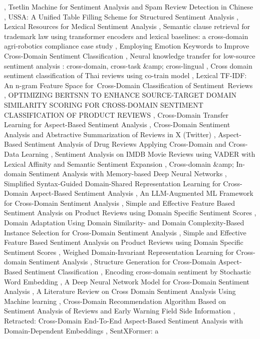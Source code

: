 \documentclass{article}
\begin{document}
\cite{neha2025retrievalaugmented537affb3}, Tsetlin Machine for Sentiment Analysis and Spam Review Detection in Chinese \cite{zhang2023tsetline116ff6e}, USSA: A Unified Table Filling Scheme for Structured Sentiment Analysis \cite{zhai2023ussa558da815}, Lexical Resources for Medical Sentiment Analysis \cite{denecke2023lexical0ce5c76a}, Semantic clause retrieval for trademark law using transformer encoders and lexical baselines: a cross-domain agri-robotics compliance case study \cite{yar2026semantic1a0d3949}, Employing Emotion Keywords to Improve Cross-Domain Sentiment Classification \cite{zhu2013employing7d8ad7a7}, Neural knowledge transfer for low-source sentiment analysis : cross-domain, cross-task \&amp; cross-lingual \cite{lindneural20d3c2bc}, Cross domain sentiment classification of Thai reviews using co-train model \cite{boonpetch2019cross70b4aff1}, Lexical TF-IDF: An n-gram Feature Space for Cross-Domain Classification of Sentiment Reviews \cite{dey2017lexicald21adc8f}, OPTIMIZING BERTSNN TO ENHANCE SOURCE-TARGET DOMAIN SIMILARITY SCORING FOR CROSS-DOMAIN SENTIMENT CLASSIFICATION OF PRODUCT REVIEWS \cite{zhao2025optimizinge8bd49e6}, Cross-Domain Transfer Learning for Aspect-Based Sentiment Analysis \cite{chen2025crossdomain4a587ac2}, Cross-Domain Sentiment Analysis and Abstractive Summarization of Reviews in X (Twitter) \cite{t2025crossdomaina88df84b}, Aspect-Based Sentiment Analysis of Drug Reviews Applying Cross-Domain and Cross-Data Learning \cite{grer2018aspectbasedf79dc6a6}, Sentiment Analysis on IMDB Movie Reviews using VADER with Lexical Affinity and Semantic Sentiment Expansion \cite{dsouza2023sentiment9a66f432}, Cross-domain \&amp; In-domain Sentiment Analysis with Memory-based Deep Neural Networks \cite{moro2018crossdomainf1d5ffae}, Simplified Syntax-Guided Domain-Shared Representation Learning for Cross-Domain Aspect-Based Sentiment Analysis \cite{zhang2024simplified92949bd4}, An LLM-Augmented ML Framework for Cross-Domain Sentiment Analysis \cite{sahoo2025llmaugmented7e9a0705}, Simple and Effective Feature Based Sentiment Analysis on Product Reviews using Domain Specific Sentiment Scores \cite{chockalingam2018simplea3346a5f}, Domain Adaptation Using Domain Similarity- and Domain Complexity-Based Instance Selection for Cross-Domain Sentiment Analysis \cite{remus2012domain12c3f822}, Simple and Effective Feature Based Sentiment Analysis on Product Reviews using Domain Specific Sentiment Scores \cite{chockalingam2018simple07544c9d}, Weighed Domain-Invariant Representation Learning for Cross-domain Sentiment Analysis \cite{peng2020weighedfbbea8f6}, Structure Generation for Cross-Domain Aspect-Based Sentiment Classification \cite{li2024structuree8ea4f03}, Encoding cross-domain sentiment by Stochastic Word Embedding \cite{paper2020encoding262d2bc9}, A Deep Neural Network Model for Cross-Domain Sentiment Analysis \cite{kumari2022deep1ee0f0fb}, A Literature Review on Cross Domain Sentiment Analysis Using Machine learning \cite{kansal2022literature8a27f43d}, Cross-Domain Recommendation Algorithm Based on Sentiment Analysis of Reviews and Early Warning Field Side Information \cite{jingwen2024crossdomain316fd614}, Retracted: Cross-Domain End-To-End Aspect-Based Sentiment Analysis with Domain-Dependent Embeddings \cite{complexity2024retracted7ea6a1ca}, SentXFormer: a 
\end{document}

